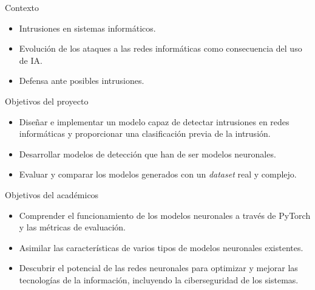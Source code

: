
\begin{frame}{Contexto}
    \begin{itemize}
    		\item Intrusiones en sistemas informáticos.
        \vspace{10mm}
        \item Evolución de los ataques a las redes informáticas como consecuencia del uso de IA.
        \vspace{10mm}
        \item Defensa ante posibles intrusiones.
    \end{itemize}
\end{frame}


\begin{frame}{Objetivos del proyecto}
    \begin{itemize}
        \item  Diseñar e implementar un modelo capaz de detectar intrusiones en redes informáticas y proporcionar una clasificación previa de la intrusión.
        \vspace{10mm}
        \item Desarrollar modelos de detección que han de ser modelos neuronales.
        \vspace{10mm}
        \item Evaluar y comparar los modelos generados con un \textit{dataset} real y complejo.
    \end{itemize}
\end{frame}

\begin{frame}{Objetivos del académicos}
    \begin{itemize}
        \item Comprender el funcionamiento de los modelos neuronales a través de PyTorch y las métricas de evaluación.
        \vspace{10mm}
        \item Asimilar las características de varios tipos de modelos neuronales existentes.
        \vspace{10mm}
        \item Descubrir el potencial de las redes neuronales para optimizar y mejorar las tecnologías de la información, incluyendo la ciberseguridad de los sistemas.
        \end{itemize}
\end{frame}